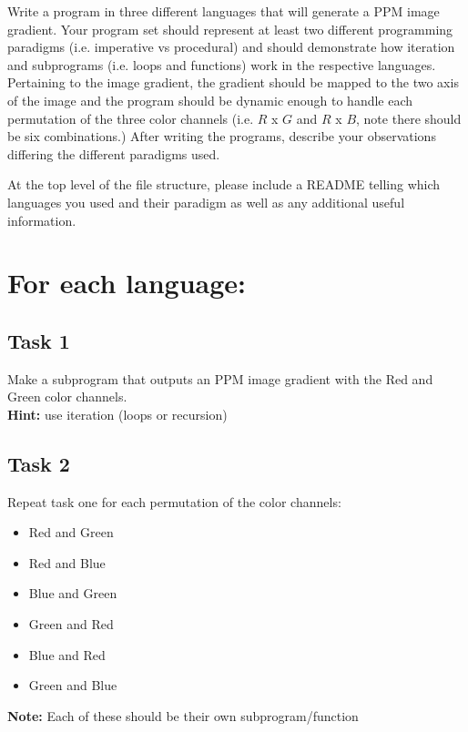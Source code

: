 \documentclass[a4paper]{article}
\begin{document}


Write a program in three different languages that will generate a PPM\cite{DUMMY1} image gradient. Your program set should represent at least two different programming paradigms (i.e. imperative vs procedural) and should demonstrate how iteration and subprograms (i.e. loops and functions) work in the respective languages. Pertaining to the image gradient, the gradient should be mapped to the two axis of the image and the program should be dynamic enough to handle each permutation of the three color channels (i.e. $R$ x $G$ and $R$ x $B$, note there should be six combinations.) After writing the programs, describe your observations differing the different paradigms used.
\vspace{5mm}

At the top level of the file structure, please include a README telling which languages you used and their paradigm as well as any additional useful information.

\section*{For each language:}
\subsection*{Task 1}
Make a subprogram that outputs an PPM image gradient with the Red and Green color channels.\\
\textbf{Hint:} use iteration (loops or recursion) 

\subsection*{Task 2}
Repeat task one for each permutation of the color channels:
\begin{itemize}
    \item Red and Green
    \item Red and Blue
    \item Blue and Green
    \item Green and Red
    \item Blue and Red
    \item Green and Blue
\end{itemize}
\textbf{Note:} Each of these should be their own subprogram/function
\end{document}
